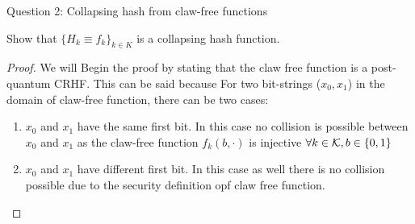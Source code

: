 \begin{solution}{Question 2: Collapsing hash from claw-free functions}\label{ques:x}
    \begin{question}
    Show that $\{H_k \equiv f_k\}_{k\in K}$ is a collapsing hash function.
    \end{question}
    \tcblower{}
    \begin{proof}
    We will Begin the proof by stating that the claw free function is a post-quantum CRHF. This can be said because For two bit-strings ($x_0,x_1$) in the domain of claw-free function, there can be two cases: \begin{enumerate}
        \item $x_0$ and $x_1$ have the same first bit. In this case no collision is possible between $x_0$ and $x_1$ as the claw-free function $f_k(b,\cdot)$ is injective $\forall k \in \mathcal{K}, b \in \{0,1\}$
        \item $x_0$ and $x_1$ have different first bit. In this case as well there is no collision possible due to the security definition opf claw free function.
    \end{enumerate}

    
    \end{proof}
\end{solution}

